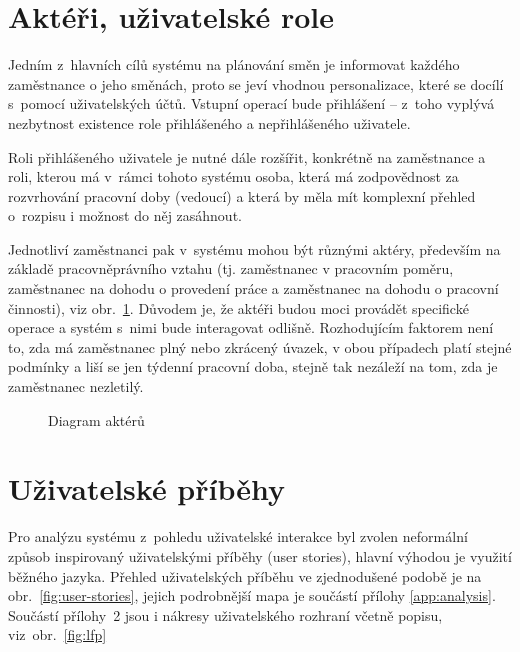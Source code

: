 \documentclass[twoside]{ctuthesis}
\begin{document}
\section{Aktéři, uživatelské role}
Jedním z~hlavních cílů systému na plánování směn je informovat každého zaměstnance o jeho směnách, proto se jeví vhodnou personalizace, které se docílí s~pomocí uživatelských účtů. Vstupní operací bude přihlášení -- z~toho vyplývá nezbytnost existence role přihlášeného a nepřihlášeného uživatele.

Roli přihlášeného uživatele je nutné dále rozšířit, konkrétně na zaměstnance a roli, kterou má v~rámci tohoto systému osoba, která má zodpovědnost za rozvrhování pracovní doby (vedoucí) a která by měla mít komplexní přehled o~rozpisu i možnost do něj zasáhnout.

Jednotliví zaměstnanci pak v~systému mohou být různými aktéry, především na základě pracovněprávního vztahu (tj. zaměstnanec v pracovním poměru, zaměstnanec na dohodu o provedení práce a zaměstnanec na dohodu o pracovní činnosti), viz obr.~\ref{fig:userroles}. Důvodem je, že aktéři budou moci provádět specifické operace a systém s~nimi bude interagovat odlišně. Rozhodujícím faktorem není to, zda má zaměstnanec plný nebo zkrácený úvazek, v obou případech platí stejné podmínky a liší se jen týdenní pracovní doba, stejně tak nezáleží na tom, zda je zaměstnanec nezletilý.

\begin{figure}[h]
	
	\caption{Diagram aktérů}
	\label{fig:userroles}
\end{figure}

\newpage
\section{Uživatelské příběhy}\label{uc-analysis}

Pro analýzu systému z~pohledu uživatelské interakce byl zvolen neformální způsob inspirovaný uživatelskými příběhy (user stories), hlavní výhodou je využití běžného jazyka. Přehled uživatelských příběhu ve zjednodušené podobě je na obr.~\ref{fig:user-stories}, jejich podrobnější mapa je součástí přílohy \ref{app:analysis}. Součástí přílohy~2 jsou i nákresy uživatelského rozhraní včetně popisu, viz~obr.~\ref{fig:lfp}
\end{document}
